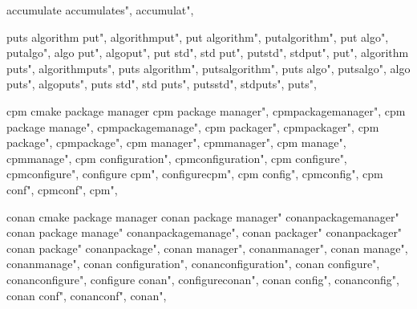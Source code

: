          accumulate
        accumulates",  
        accumulat",  
        
         puts 
        algorithm put",  
        algorithmput",  
        put algorithm",  
        putalgorithm",  
        put algo",  
        putalgo",  
        algo put",  
        algoput",  
        put std",  
        std put",  
        putstd",  
        stdput",  
        put",  
        algorithm puts",  
        algorithmputs",  
        puts algorithm",  
        putsalgorithm",  
        puts algo",  
        putsalgo",  
        algo puts",  
        algoputs",  
        puts std",  
        std puts",  
        putsstd",  
        stdputs",  
        puts",  
        
         cpm cmake package manager
        cpm package manager",  
        cpmpackagemanager",  
        cpm package manage",  
        cpmpackagemanage",  
        cpm packager",  
        cpmpackager",  
        cpm package",  
        cpmpackage",  
        cpm manager",  
        cpmmanager",  
        cpm manage",  
        cpmmanage",  
        cpm configuration",  
        cpmconfiguration",  
        cpm configure",  
        cpmconfigure",  
        configure cpm",  
        configurecpm",  
        cpm config",  
        cpmconfig",  
        cpm conf",  
        cpmconf",  
        cpm",  
        
         
         conan cmake package manager
        conan package manager"
        conanpackagemanager" 
        conan package manage"
        conanpackagemanage",
        conan packager"
        conanpackager"
        conan package"
        conanpackage", 
        conan manager",
        conanmanager", 
        conan manage", 
        conanmanage",
        conan configuration", 
        conanconfiguration",
        conan configure",
        conanconfigure",
        configure conan",
        configureconan",
        conan config",
        conanconfig",
        conan conf",
        conanconf",
        conan",
